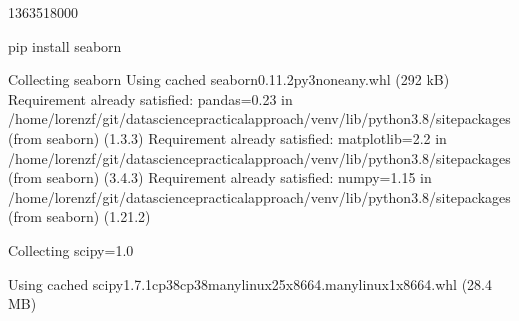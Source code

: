 \documentclass[letterpaper,10pt,english]{jupyterBook}
\begin{document}
\begin{sphinxVerbatim}[commandchars=\\\{\}]
\PYG{p}{[}\PYG{p}{]}
\end{sphinxVerbatim}

\begin{sphinxVerbatim}[commandchars=\\\{\}]
1363518000
\end{sphinxVerbatim}

\begin{sphinxVerbatim}[commandchars=\\\{\}]
pip install seaborn
   
\end{sphinxVerbatim}

\begin{sphinxVerbatim}[commandchars=\\\{\}]
Collecting seaborn
  Using cached seaborn\PYGZhy{}0.11.2\PYGZhy{}py3\PYGZhy{}none\PYGZhy{}any.whl (292 kB)
Requirement already satisfied: pandas\PYGZgt{}=0.23 in /home/lorenzf/git/data\PYGZhy{}science\PYGZhy{}practical\PYGZhy{}approach/venv/lib/python3.8/site\PYGZhy{}packages (from seaborn) (1.3.3)
Requirement already satisfied: matplotlib\PYGZgt{}=2.2 in /home/lorenzf/git/data\PYGZhy{}science\PYGZhy{}practical\PYGZhy{}approach/venv/lib/python3.8/site\PYGZhy{}packages (from seaborn) (3.4.3)
Requirement already satisfied: numpy\PYGZgt{}=1.15 in /home/lorenzf/git/data\PYGZhy{}science\PYGZhy{}practical\PYGZhy{}approach/venv/lib/python3.8/site\PYGZhy{}packages (from seaborn) (1.21.2)
\end{sphinxVerbatim}

\begin{sphinxVerbatim}[commandchars=\\\{\}]
Collecting scipy\PYGZgt{}=1.0
\end{sphinxVerbatim}

\begin{sphinxVerbatim}[commandchars=\\\{\}]
  Using cached scipy\PYGZhy{}1.7.1\PYGZhy{}cp38\PYGZhy{}cp38\PYGZhy{}manylinux\PYGZus{}2\PYGZus{}5\PYGZus{}x86\PYGZus{}64.manylinux1\PYGZus{}x86\PYGZus{}64.whl (28.4 MB)
\end{sphinxVerbatim}
\end{document}
